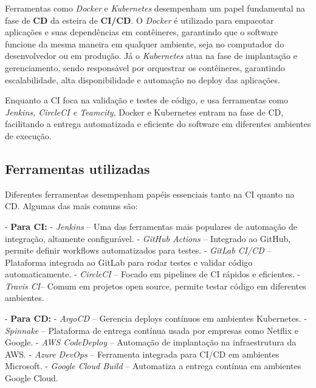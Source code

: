 \documentclass[a4paper,12pt]{article}
\begin{document}
Ferramentas como \textit{Docker} e \textit{Kubernetes} desempenham um papel fundamental na fase de \textbf{CD} da esteira de \textbf{CI/CD}. O \textit{Docker} é utilizado para empacotar aplicações e suas dependências em contêineres, garantindo que o software funcione da mesma maneira em qualquer ambiente, seja no computador do desenvolvedor ou em produção. Já o \textit{Kubernetes} atua na fase de implantação e gerenciamento, sendo responsável por orquestrar os contêineres, garantindo escalabilidade, alta disponibilidade e automação no deploy das aplicações.  

Enquanto a CI foca na validação e testes de código, e usa ferramentas como \textit{Jenkins, CircleCI e Teamcity}, Docker e Kubernetes entram na fase de CD, facilitando a entrega automatizada e eficiente do software em diferentes ambientes de execução.
\subsection*{Ferramentas utilizadas}
Diferentes ferramentas desempenham papéis essenciais tanto na CI quanto na CD. Algumas das mais comuns são:  

- \textbf{Para CI:} \newline{} 
- \textit{Jenkins} – Uma das ferramentas mais populares de automação de integração, altamente configurável.  \newline{}
  -  \textit{GitHub Actions} – Integrado ao GitHub, permite definir workflows automatizados para testes.  \newline{}
  -  \textit{GitLab CI/CD} – Plataforma integrada ao GitLab para rodar testes e validar código automaticamente.  \newline{}
  -  \textit{CircleCI} – Focado em pipelines de CI rápidos e eficientes.  \newline{}
  -  \textit{Travis CI}– Comum em projetos open source, permite testar código em diferentes ambientes.  \newline{}

  - \textbf{Para CD:} \newline
- \textit{ArgoCD} – Gerencia deploys contínuos em ambientes Kubernetes. \newline 
- \textit{Spinnake} – Plataforma de entrega contínua usada por empresas como Netflix e Google. \newline
- \textit{AWS CodeDeploy} – Automação de implantação na infraestrutura da AWS. \newline
- \textit{Azure DevOps} – Ferramenta integrada para CI/CD em ambientes Microsoft. \newline
- \textit{Google Cloud Build} – Automatiza a entrega contínua em ambientes Google Cloud. \newline
\end{document}
